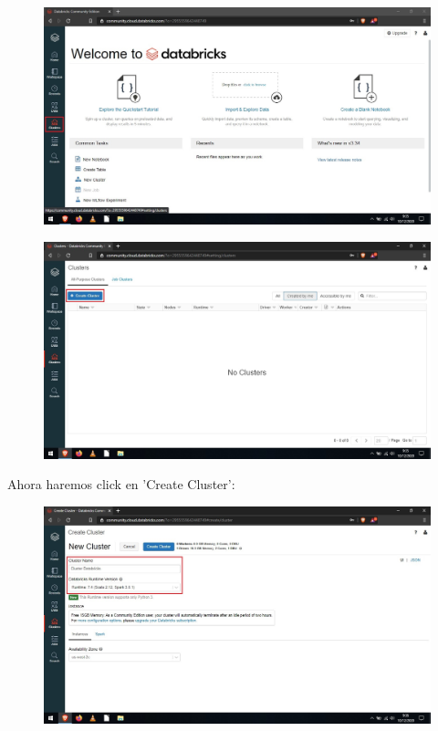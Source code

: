 \documentclass[a4paper,10pt]{article}
\begin{document}
\begin{figure}[H]
\begin{center}
\includegraphics[width=500pt]{./fotos/Databricks/4 - Databricks (V).jpg}
\end{center}
\end{figure}

\begin{figure}[H]
\begin{center}
\includegraphics[width=500pt]{./fotos/Databricks/5 - Databricks (V).jpg}
\end{center}
\end{figure}

Ahora haremos click en 'Create Cluster':

\begin{figure}[H]
\begin{center}
\includegraphics[width=500pt]{./fotos/Databricks/6 - Databricks (V).jpg}
\end{center}
\end{figure}
\end{document}
